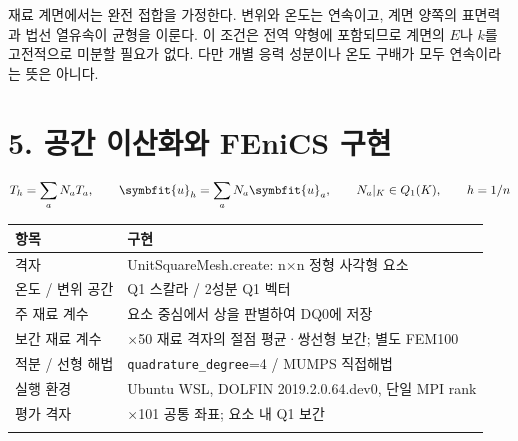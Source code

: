 \documentclass[10pt,a4paper]{article}
\renewcommand{\boldsymbol}[1]{\symbfit{#1}}
\begin{document}
재료 계면에서는 완전 접합을 가정한다. 변위와 온도는 연속이고, 계면 양쪽의 표면력과 법선 열유속이 균형을 이룬다. 이 조건은 전역 약형에 포함되므로 계면의 $E$나 $k$를 고전적으로 미분할 필요가 없다. 다만 개별 응력 성분이나 온도 구배가 모두 연속이라는 뜻은 아니다.\par

\clearpage

\section{5. 공간 이산화와 FEniCS 구현}

\begin{equation}T_h=\sum_a N_a T_a,\qquad\boldsymbol u_h=\sum_a N_a\boldsymbol u_a,\qquad N_a|_K\in Q_1(K),\qquad h=1/n\end{equation}

\begingroup\small

\par\begin{minipage}{\linewidth}\begin{tabular}{>{\raggedright\arraybackslash}p{}>{\raggedright\arraybackslash}p{}}

\rowcolor{tint} \textbf{항목} & \textbf{구현}\\\midrule

격자 & UnitSquareMesh.create: n$\times$n 정형 사각형 요소\\\addlinespace[2pt]

온도 / 변위 공간 & Q1 스칼라 / 2성분 Q1 벡터\\\addlinespace[2pt]

주 재료 계수 & 요소 중심에서 상을 판별하여 DQ0에 저장\\\addlinespace[2pt]

보간 재료 계수 & 50$\times$50 재료 격자의 절점 평균·쌍선형 보간; 별도 FEM100\\\addlinespace[2pt]

적분 / 선형 해법 & \nolinkurl{quadrature_degree}=4 / MUMPS 직접해법\\\addlinespace[2pt]

실행 환경 & Ubuntu WSL, DOLFIN 2019.2.0.64.dev0, 단일 MPI rank\\\addlinespace[2pt]

평가 격자 & 101$\times$101 공통 좌표; 요소 내 Q1 보간\\\addlinespace[2pt]

\bottomrule\end{tabular}\end{minipage}\par\vspace{5pt}\endgroup
\end{document}
